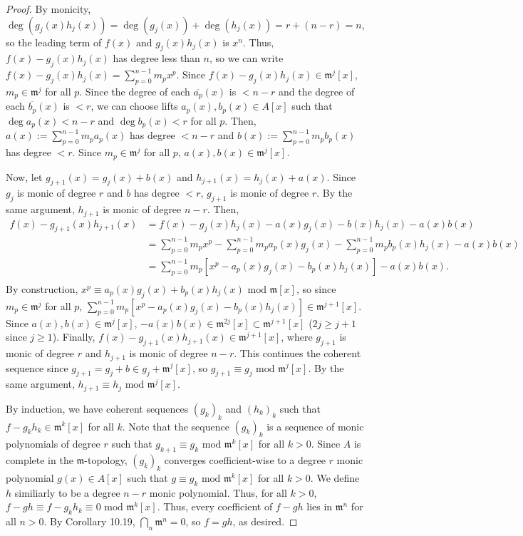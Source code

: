 \begin{proof}
By monicity, $\deg(g_j(x)h_j(x)) = \deg(g_j(x)) + \deg(h_j(x)) = r + (n-r) = n$, so the leading term of $f(x)$ and $g_j(x)h_j(x)$ is $x^n$.
Thus, $f(x) - g_j(x)h_j(x)$ has degree less than $n$, so we can write $f(x) - g_j(x) h_j(x) = \sum_{p=0}^{n-1} m_p x^p$. Since 
$f(x) - g_j(x) h_j(x) \in \mathfrak{m}^j[x]$, $m_p \in \mathfrak{m}^j$ for all $p$. Since the degree of each $\overline{a_p}(x)$ is $< n-r$ and 
the degree of each $\overline{b_p}(x)$ is $< r$, we can choose lifts $a_p(x), b_p(x) \in A[x]$ such that $\deg a_p(x) < n-r$ and $\deg b_p(x) < r$ 
for all $p$. Then, $a(x) := \sum_{p=0}^{n-1} m_p a_p(x)$ has degree $< n-r$ and $b(x) := \sum_{p=0}^{n-1} m_p b_p(x)$ has degree $< r$. 
Since $m_p \in \mathfrak{m}^j$ for all $p$, $a(x), b(x) \in \mathfrak{m}^j[x]$.

Now, let $g_{j+1}(x) = g_j(x) + b(x)$ and $h_{j+1}(x) = h_j(x) + a(x)$. Since $g_j$ is monic of degree $r$ and $b$ has degree $< r$,
$g_{j+1}$ is monic of degree $r$. By the same argument, $h_{j+1}$ is monic of degree $n - r$. Then,
\begin{align*}
f(x) - g_{j+1}(x)h_{j+1}(x) &= f(x) - g_j(x)h_j(x) - a(x)g_j(x) - b(x)h_j(x) - a(x)b(x) \\
&= \sum_{p=0}^{n-1} m_p x^p - \sum_{p=0}^{n-1} m_p a_p(x) g_j(x) - \sum_{p=0}^{n-1} m_p b_p(x) h_j(x) - a(x)b(x) \\
&= \sum_{p=0}^{n-1} m_p [x^p - a_p(x) g_j(x) - b_p(x) h_j(x)] - a(x)b(x). \\
\end{align*}
By construction, $x^p \equiv a_p(x) g_j(x) + b_p(x) h_j(x) \text{ mod }\mathfrak{m}[x]$, so since $m_p \in \mathfrak{m}^j$ for all $p$,
$\sum_{p=0}^{n-1} m_p [x^p - a_p(x) g_j(x) - b_p(x) h_j(x)] \in \mathfrak{m}^{j+1}[x]$. Since $a(x),b(x) \in \mathfrak{m}^j[x]$,
$-a(x)b(x) \in \mathfrak{m}^{2j}[x] \subset \mathfrak{m}^{j+1}[x]$ ($2j \ge j + 1$ since $j \ge 1$). Finally, $f(x) - g_{j+1}(x)h_{j+1}(x) \in \mathfrak{m}^{j+1}[x]$,
where $g_{j+1}$ is monic of degree $r$ and $h_{j+1}$ is monic of degree $n - r$. This continues the coherent sequence since
$g_{j+1} = g_j + b \in g_j + \mathfrak{m}^j[x]$, so $g_{j+1} \equiv g_j \text{ mod }\mathfrak{m}^j[x]$. By the same argument,
$h_{j+1} \equiv h_j \text{ mod }\mathfrak{m}^j[x]$.

By induction, we have coherent sequences $(g_k)_k$ and $(h_k)_k$ such that $f - g_k h_k \in \mathfrak{m}^k[x]$ for all $k$. Note
that the sequence $(g_k)_k$ is a sequence of monic polynomials of degree $r$ such that $g_{k+1} \equiv g_k \text{ mod }\mathfrak{m}^k[x]$
for all $k > 0$. Since $A$ is complete in the $\mathfrak{m}$-topology, $(g_k)_k$ converges coefficient-wise to a degree $r$ monic polynomial
$g(x) \in A[x]$ such that $g \equiv g_k \text{ mod } \mathfrak{m}^k[x]$ for all $k > 0$. We define $h$ similiarly to be a degree $n-r$
monic polynomial. Thus, for all $k > 0$, $f - g h \equiv f - g_k h_k \equiv 0 \text{ mod }\mathfrak{m}^k[x]$. Thus, every coefficient of
$f - gh$ lies in $\mathfrak{m}^n$ for all $n > 0$. By Corollary 10.19, $\bigcap_n \mathfrak{m}^n = 0$, so $f = gh$, as desired.
\end{proof}


